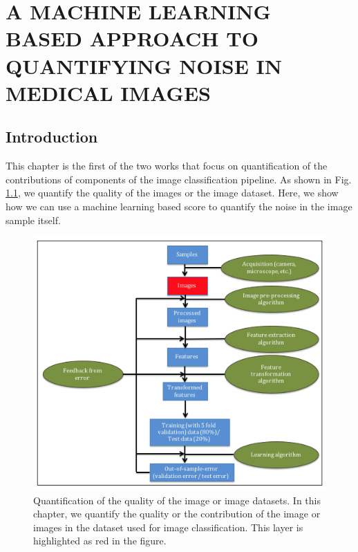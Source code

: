 \chapter{A MACHINE LEARNING BASED APPROACH TO QUANTIFYING NOISE IN MEDICAL IMAGES}
\label{chap:SPIE1}

\let\thefootnote\relax{}

\section{Introduction}

This chapter is the first of the two works that focus on quantification of the contributions of components of the image classification pipeline. As shown in Fig. \ref{fig:chapter4}, we quantify the quality of the images or the image dataset. Here, we show how we can use a machine learning based score to quantify the noise in the image sample itself. 

\begin{figure}[ht!]
\centering
\includegraphics[width=1.0\textwidth]{img/chapter4}
\caption{Quantification of the quality of the image or image datasets. In this chapter, we quantify the quality or the contribution of the image or images in the dataset used for image classification. This layer is highlighted as red in the figure.}
\label{fig:chapter4}
\end{figure}


